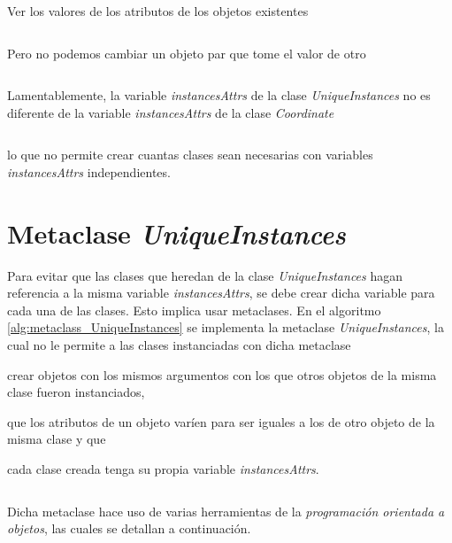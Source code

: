 \documentclass{article}
\newenvironment{code}{\captionsetup{type=listing}}{}
\begin{document}
	Ver los valores de los atributos de los objetos existentes
	\inputminted[firstline=94, lastline=94, breaklines]{python}{collection_class.py}

	Pero no podemos cambiar un objeto par que tome el valor de otro
	\inputminted[firstline=110, lastline=111, breaklines]{python}{collection_class.py}

	Lamentablemente, la variable \emph{instancesAttrs} de la clase \emph{UniqueInstances} no es diferente de la variable \emph{instancesAttrs} de la clase \emph{Coordinate}
	\inputminted[firstline=113, lastline=114, breaklines]{python}{collection_class.py}
	lo que no permite crear cuantas clases sean necesarias con variables \emph{instancesAttrs} independientes.

	\section{Metaclase \emph{UniqueInstances}}

	Para evitar que las clases que heredan de la clase \emph{UniqueInstances} hagan referencia a la misma variable \emph{instancesAttrs}, se debe crear dicha variable para cada una de las clases. Esto implica usar metaclases. En el algoritmo \ref{alg:metaclass_UniqueInstances} se implementa la metaclase \emph{UniqueInstances}, la cual no le permite a las clases instanciadas con dicha metaclase
	\begin{enumerate*}[label=\itshape\alph*\upshape)]
		\item crear objetos con los mismos argumentos con los que otros objetos de la misma clase fueron instanciados, 
		\item que los atributos de un objeto varíen para ser iguales a los de otro objeto de la misma clase y que
		\item cada clase creada tenga su propia variable \emph{instancesAttrs}.
	\end{enumerate*}

	\begin{code}
		\inputminted[firstline=1, lastline=58, linenos, breaklines]{python}{collection.py}
		\label{alg:metaclass_UniqueInstances}
	\end{code}

	Dicha metaclase hace uso de varias herramientas de la \emph{programación orientada a objetos}, las cuales se detallan a continuación.
\end{document}
